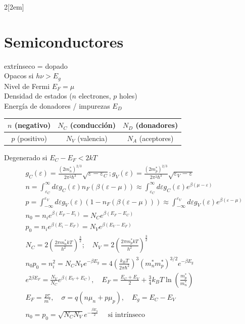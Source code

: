 \documentclass[leqno]{article}
\begin{document}
\begin{multicols}{2}[\columnsep2em]
\section{Semiconductores}
extrínseco = dopado\\
Opacos si $h \nu > E_g$\\
Nivel de Fermi $E_F = \mu$\\
Densidad de estados ($n$ electrones, $p$ holes)\\
Energía de donadores / impurezas $E_D$
\begin{center}
\begin{tabular}{c|c|c}
  $n$ (negativo) & $N_C$ (conducción) & $N_D$ (donadores)\\
\hline
  $p$ (positivo) & $N_V$ (valencia) & $N_A$ (aceptores)
\end{tabular}
\end{center}
Degenerado si $E_C-E_F <2kT$
\begin{align*}
&g_C(\varepsilon ) = \frac{(2m^*_n) ^{2 /3}}{2\pi ^2\hbar ^3}\sqrt{\varepsilon -\varepsilon _C} ; 
g_V(\varepsilon ) = \frac{(2m^*_p) ^{2 /3}}{2\pi ^2\hbar ^3}\sqrt{\varepsilon _V-\varepsilon } \\
& n = \int_{\varepsilon _C}^\infty d\varepsilon g_C(\varepsilon )n_F(\beta (\varepsilon -\mu ))\approx \int _{\varepsilon _C}^\infty d\varepsilon g_C(\varepsilon ) e ^{\beta (\mu -\varepsilon )}\\
& p = \int^{\varepsilon _V}_{-\infty} d\varepsilon g_V(\varepsilon )(1-n_F(\beta (\varepsilon -\mu )))\approx \int ^{\varepsilon _V}_{-\infty} d\varepsilon g_V(\varepsilon ) e ^{\beta (\varepsilon-\mu )}\\
&n_0 = n_i e ^{\beta (E_F-E_i)} = N_C e ^{\beta (E_F -E _C)}\\
&p_0 = n_i e ^{\beta (E_i-E_F)} = N_V e ^{\beta (E_V-E_F )}\\
& N_C = 2 \left( \frac{2\pi m_n^* kT}{h^2} \right) ^{\frac{3}{2}}; \quad N_V = 2 \left( \frac{2\pi m_p^* kT}{h^2} \right) ^{\frac{3}{2}} \\
& n_0p_0 = n_i^2 = N_CN_V e ^{-\beta E_g} = 4 \left(\frac{k_BT}{2\pi \hbar ^2}\right)^3(m_n^*m_p^*)^{3 / 2}e ^{-\beta E_g}\\
& e ^{2\beta E_F } = \frac{N_V}{N_C} e ^{\beta (E_V + E_C)}, \quad
E_F  = \frac{E_C+E_V}{2} + \frac{3}{4}k_BT\ln\left( \frac{m_p^*}{m_n^*} \right) \\
& E_F = \frac{p\tau }{m^*}, \quad \sigma  = q(n\mu _n+ p\mu _p), \quad E_g = E_C-E_V\\
& n_0 = p_0 = \sqrt{N_CN_V}e ^{-\frac{\beta E_g}{2}} \quad \text{ si intrínseco}
\end{align*}



\end{multicols}
\end{document}
